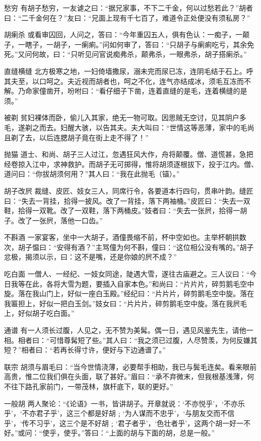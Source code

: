 \documentclass[12pt,UTF8]{ctexbook}
\begin{document}
愁穷
有胡子愁穷，一友谑之曰：“据兄家事，不下二千金，何以过愁若此？”胡者曰：“二千金何在？”友曰：“兄面上现有千七百了，难道令正处便没有须私房？”

胡瘌杀
或看审囚回，人问之，答曰：“今年重囚五人，俱有色认：一痴子，一颠子，一瞎子，一胡子，一瘌痢。”问如何审了，答曰：“只胡子与瘌痢吃亏，其余免死。”又问何故，曰：“只听见问官说痴弗杀，颠弗杀，一眼弗杀，胡子搭瘌杀。”

直缝横缝
北方极寒之地，一妇倚墙撒尿，溺未完而尿已冻，连阴毛结于石上。呼其夫至，以口呵之。夫近视而胡者也，呵之不化，连气亦结成冰，须毛互冻而不解。乃命家僮凿开，吩咐曰：“看仔细子下凿，连着直缝的是毛，连着横缝的是须。”

被剃
贫妇裸体而卧，偷儿入其家，绝无一物可取。因思贼无空讨，见其阴户多毛，遂剃之而去。妇醒大骇，以告其夫。夫大叫曰：“世情这等恶薄，家中的毛尚且剃了去，以后连腮胡子竟在街上走不得了！”

抛猫
道士、和尚、胡子三人过江，忽遇狂风大作，舟将颠覆。僧、道慌甚，急把经卷掠入江中，求神救护。而胡子无可掷得，惟将胡须逐根拔下，投于江内。僧、道问曰：“你拔胡须何用？”其人曰：“我在此抛毛（锚）。”

胡子改屄
裁缝、皮匠、妓女三人，同席行令，各要道本行四句，贯串叶韵。缝匠曰：“失去一背挂，拾得一披风。改了一背挂，落下两袖桶。”皮匠曰：“失去一双鞋，拾得一双靴。改了一双鞋，落下两桶皮。”妓者曰：“失去一张屄，拾得一胡子。改了一张屄，落他一口齿。”

不斟酒
一家宴客，坐中一大胡子，酒僮畏缩不前，杯中空如也。主举杯朝拱数次，胡子愠曰：“安得有酒？”主骂僮为何不斟，僮曰：“这位相公没有嘴的。”胡子忿极，揭须以示，曰：这不是嘴，还是你娘的屄不成？”

吃白面
一僧人、一经纪、一妓女同途，陡遇大雪，遂往古庙避之。三人议曰：“今日我等在此，各将大雪为题，要插入自家本色。”和尚曰：“片片片，碎剪鹅毛空中旋。落在我山门上，好似一座白玉殿。”经纪曰：“片片片，碎剪鹅毛空中旋。落在我匾担上，好似一把白玉剑。”妓女曰：“片片片，碎剪鹅毛空中旋。落在我屄毛上，好似胡子吃白面。”

通谱
有一人须长过腹，人见之，无不赞为美髯。偶一日，遇见风鉴先生，请他一相。相者曰：“可惜尊髯短了些。”其人曰：“我之须已过腹，人尽赞羡，为何反嫌其短？”相者曰：“若再长得寸许，便好与下边通谱了。”

联宗
胡须与眉毛曰：“当今世情浇薄，必要帮手相助，我已与鬓毛连矣。看来眼前高贵，惟二位我们俱在头面，联了甚好。”眉曰：“承不弃微末，但我根基浅薄，何不往下路孔家前门，一带茂林，旗杆底下，联的更好。”

一般胡
两人聚论：“《论语》一书，皆讲胡子。开章就说：‘不亦悦乎’，‘不亦乐乎’，‘不亦君子乎’，这三个都是好胡﹔‘为人谋而不忠乎’，‘与朋友交而不信乎’，‘传不习乎’，这三个是不好胡﹔‘君子者乎’，‘色壮者乎’，这两个胡一好一不好。”或问：“使乎，使乎。”答曰：“上面的胡与下面的胡，总是一般。”
\end{document}

